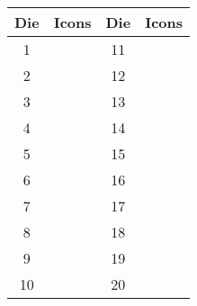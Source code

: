\documentclass[landscape, a4paper, parskip=half, DIV=13]{scrartcl}
\begin{document}
\begin{center}
{\begin{center}
\begin{tabular}{c c@{\hskip 3pt}c@{\hskip 3pt}c c c@{\hskip 3pt}c@{\hskip 3pt}c}\toprule
Die & \multicolumn{3}{c}{Icons} & Die & \multicolumn{3}{c}{Icons} \\ \midrule
\phantom{1}1 & \raisebox{-0.25ex}{\drawonestar{}} & \raisebox{-0.25ex}{\drawtwostar{}} & \raisebox{-0.25ex}{\drawthreestar{}} & 11 & \raisebox{-0.25ex}{\drawfourstar{}} & \raisebox{-0.25ex}{\drawfivestar{}} & \raisebox{-0.25ex}{\drawsixstar{}} \\[0.5ex]
\phantom{1}2 & \raisebox{-0.25ex}{\drawonestar{}} & \raisebox{-0.25ex}{\drawtwostar{}} & \raisebox{-0.25ex}{\drawfourstar{}} & 12 & \raisebox{-0.25ex}{\drawthreestar{}} & \raisebox{-0.25ex}{\drawfivestar{}} & \raisebox{-0.25ex}{\drawsixstar{}} \\[0.5ex]
\phantom{1}3 & \raisebox{-0.25ex}{\drawonestar{}} & \raisebox{-0.25ex}{\drawtwostar{}} & \raisebox{-0.25ex}{\drawfivestar{}} & 13 & \raisebox{-0.25ex}{\drawthreestar{}} & \raisebox{-0.25ex}{\drawfourstar{}} & \raisebox{-0.25ex}{\drawsixstar{}} \\[0.5ex]
\phantom{1}4 & \raisebox{-0.25ex}{\drawonestar{}} & \raisebox{-0.25ex}{\drawtwostar{}} & \raisebox{-0.25ex}{\drawsixstar{}} & 14 & \raisebox{-0.25ex}{\drawthreestar{}} & \raisebox{-0.25ex}{\drawfourstar{}} & \raisebox{-0.25ex}{\drawfivestar{}} \\[0.5ex]
\phantom{1}5 & \raisebox{-0.25ex}{\drawonestar{}} & \raisebox{-0.25ex}{\drawthreestar{}} & \raisebox{-0.25ex}{\drawfourstar{}} & 15 & \raisebox{-0.25ex}{\drawtwostar{}} & \raisebox{-0.25ex}{\drawfivestar{}} & \raisebox{-0.25ex}{\drawsixstar{}} \\[0.5ex]
\phantom{1}6 & \raisebox{-0.25ex}{\drawonestar{}} & \raisebox{-0.25ex}{\drawthreestar{}} & \raisebox{-0.25ex}{\drawfivestar{}} & 16 & \raisebox{-0.25ex}{\drawtwostar{}} & \raisebox{-0.25ex}{\drawfourstar{}} & \raisebox{-0.25ex}{\drawsixstar{}} \\[0.5ex]
\phantom{1}7 & \raisebox{-0.25ex}{\drawonestar{}} & \raisebox{-0.25ex}{\drawthreestar{}} & \raisebox{-0.25ex}{\drawsixstar{}} & 17 & \raisebox{-0.25ex}{\drawtwostar{}} & \raisebox{-0.25ex}{\drawfourstar{}} & \raisebox{-0.25ex}{\drawfivestar{}} \\[0.5ex]
\phantom{1}8 & \raisebox{-0.25ex}{\drawonestar{}} & \raisebox{-0.25ex}{\drawfourstar{}} & \raisebox{-0.25ex}{\drawfivestar{}} & 18 & \raisebox{-0.25ex}{\drawtwostar{}} & \raisebox{-0.25ex}{\drawthreestar{}} & \raisebox{-0.25ex}{\drawsixstar{}} \\[0.5ex]
\phantom{1}9 & \raisebox{-0.25ex}{\drawonestar{}} & \raisebox{-0.25ex}{\drawfourstar{}} & \raisebox{-0.25ex}{\drawsixstar{}} & 19 & \raisebox{-0.25ex}{\drawtwostar{}} & \raisebox{-0.25ex}{\drawthreestar{}} & \raisebox{-0.25ex}{\drawfivestar{}} \\[0.5ex]
10 & \raisebox{-0.25ex}{\drawonestar{}} & \raisebox{-0.25ex}{\drawfivestar{}} & \raisebox{-0.25ex}{\drawsixstar{}} & 20 & \raisebox{-0.25ex}{\drawtwostar{}} & \raisebox{-0.25ex}{\drawthreestar{}} & \raisebox{-0.25ex}{\drawfourstar{}} \\ \bottomrule


\end{tabular}
\end{center}}
\end{center}
\end{document}
